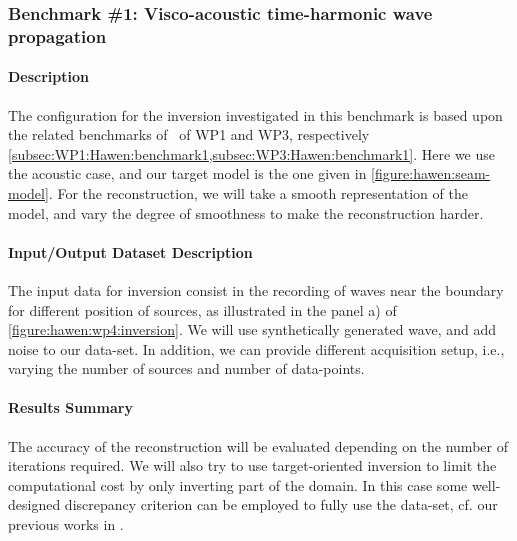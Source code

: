 \subsubsection{Benchmark \#1: Visco-acoustic time-harmonic wave propagation}
\label{subsec:WP4:Hawen:benchmark1}


\paragraph{Description}
The configuration for the inversion investigated in this benchmark
is based upon the related benchmarks of \hawen~of WP1 and WP3, 
respectively \cref{subsec:WP1:Hawen:benchmark1,subsec:WP3:Hawen:benchmark1}.
Here we use the acoustic case, and our target model is the one 
given in \cref{figure:hawen:seam-model}.
For the reconstruction, we will take a smooth representation of the 
model, and vary the degree of smoothness to make the reconstruction 
harder. 

\paragraph{Input/Output Dataset Description}
The input data for inversion consist in the recording 
of waves near the boundary for different position of 
sources, as illustrated in the panel a) 
of \cref{figure:hawen:wp4:inversion}. We will use 
synthetically generated wave, and add noise to our data-set. 
In addition, we can provide different acquisition setup, 
i.e., varying the number of sources and number of data-points.


\paragraph{Results Summary}
The accuracy of the reconstruction will be evaluated depending
on the number of iterations required. We will also try to use 
target-oriented inversion to limit the computational cost by 
only inverting part of the domain. 
In this case some well-designed discrepancy criterion can be 
employed to fully use the data-set, cf. our previous works in
\cite{Faucher2019FRgWIGeo,Faucher2020DAS}.

